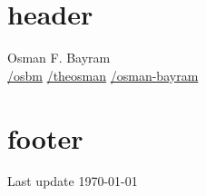 \documentclass{article} %
\author{Osman Faruk Bayram}
\begin{document}
\section{header}
Osman F. Bayram \\

\href{http://github.com/osbm}{/osbm} \quad
{}\href{https://www.kaggle.com/theosman}{/theosman} \quad
{}\href{https://www.linkedin.com/in/osman-bayram-648883200}{/osman-bayram}


\section{footer}

Last update \today
\end{document}
